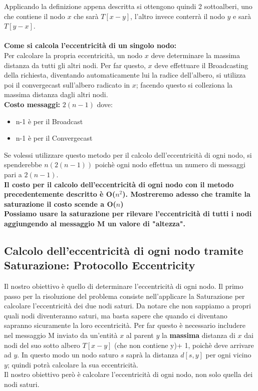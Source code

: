 Applicando la definizione appena descritta si ottengono quindi 2 sottoalberi, uno che contiene il nodo $x$ che sarà $T[x - y]$, l'altro invece conterrà il nodo $y$ e sarà $T[y - x]$. \\\\
\textbf{Come si calcola l'eccentricità di un singolo nodo:}\\
Per calcolare la propria eccentricità, un nodo $x$ deve determinare la massima distanza da tutti gli altri nodi. Per far questo, $x$ deve effettuare il Broadcasting della richiesta, diventando automaticamente lui la radice dell'albero, si utilizza poi il convergecast sull'albero radicato in $x$; facendo questo si colleziona la massima distanza dagli altri nodi.\\
\textbf{Costo messaggi:} $2(n-1)$ dove:
\begin{itemize}
    \item n-1 è  per il Broadcast
    \item n-1 è per il Convergecast
\end{itemize}
Se volessi utilizzare questo metodo per il calcolo dell'eccentricità di ogni nodo, si spenderebbe $n(2(n-1))$ poichè ogni nodo effettua un numero di messaggi pari a $2(n-1)$.\\

\textbf{Il costo per il calcolo dell'eccentricità di ogni nodo con il metodo precedentemente descritto è O($n^2$). Mostreremo adesso che tramite la saturazione il costo scende a O($n$)}\\

\textbf{Possiamo usare la saturazione per rilevare l'eccentricità di tutti i nodi aggiungendo al messaggio M un valore di "altezza".}

\subsection{Calcolo dell'eccentricità di ogni nodo tramite Saturazione: Protocollo Eccentricity}
Il nostro obiettivo è quello di determinare l'eccentricità di ogni nodo. Il primo passo per la risoluzione del problema consiste nell'applicare la Saturazione per calcolare l'eccentricità dei due nodi saturi. Da notare che non sappiamo a propri quali nodi diventeranno saturi, ma basta sapere che quando ci diventano sapranno sicuramente la loro eccentricità. Per far questo è necessario includere nel messaggio M inviato da un'entità $x$ al parent $y$ la \textbf{massima} distanza di $x$ dai nodi del suo sotto albero $T[x-y]$ (che non contiene y)+ 1, poichè deve arrivare ad $y$. In questo modo un nodo saturo $s$ saprà la distanza $d[s,y]$ per ogni vicino $y$; quindi potrà calcolare la sua eccentricità. \\
Il nostro obiettivo però è calcolare l'eccentricità di ogni nodo, non solo quella dei nodi saturi.\\

